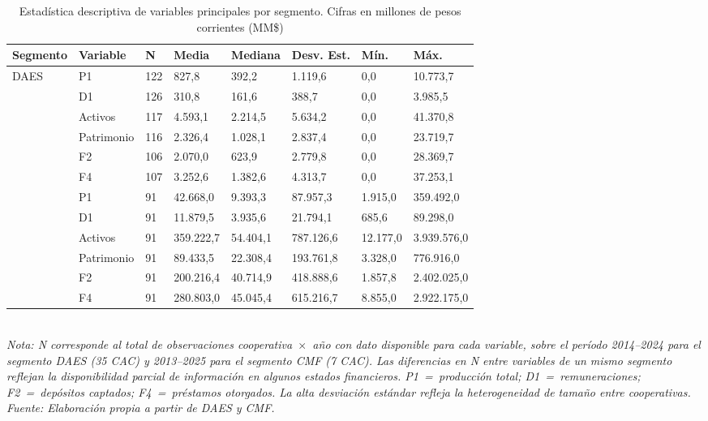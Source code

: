 \begin{table}[H]
\centering
\scriptsize
\setlength{\tabcolsep}{4pt}
\caption{Estadística descriptiva de variables principales por segmento. 
Cifras en millones de pesos corrientes (MM\$)}
\label{tab:estadistica_descriptiva}
\begin{tabular*}{\textwidth}{@{\extracolsep{\fill}}
  p{1.8cm} p{1.8cm} p{1cm} p{1.8cm} p{1.8cm} p{1.8cm} p{1.5cm} p{1.8cm}}
\toprule
\textbf{Segmento} & \textbf{Variable} & \textbf{N} & \textbf{Media} & 
\textbf{Mediana} & \textbf{Desv. Est.} & \textbf{Mín.} & \textbf{Máx.} \\
\midrule
\multirow{6}{*}{DAES} 
  & P1         & 122 & 827,8     & 392,2     & 1.119,6   & 0,0    & 10.773,7  \\
  & D1         & 126 & 310,8     & 161,6     & 388,7     & 0,0    & 3.985,5   \\
  & Activos    & 117 & 4.593,1   & 2.214,5   & 5.634,2   & 0,0    & 41.370,8  \\
  & Patrimonio & 116 & 2.326,4   & 1.028,1   & 2.837,4   & 0,0    & 23.719,7  \\
  & F2         & 106 & 2.070,0   & 623,9     & 2.779,8   & 0,0    & 28.369,7  \\
  & F4         & 107 & 3.252,6   & 1.382,6   & 4.313,7   & 0,0    & 37.253,1  \\
\addlinespace
\multirow{6}{*}{CMF}  
  & P1         & 91  & 42.668,0  & 9.393,3   & 87.957,3  & 1.915,0  & 359.492,0   \\
  & D1         & 91  & 11.879,5  & 3.935,6   & 21.794,1  & 685,6    & 89.298,0    \\
  & Activos    & 91  & 359.222,7 & 54.404,1  & 787.126,6 & 12.177,0 & 3.939.576,0 \\
  & Patrimonio & 91  & 89.433,5  & 22.308,4  & 193.761,8 & 3.328,0  & 776.916,0   \\
  & F2         & 91  & 200.216,4 & 40.714,9  & 418.888,6 & 1.857,8  & 2.402.025,0 \\
  & F4         & 91  & 280.803,0 & 45.045,4  & 615.216,7 & 8.855,0  & 2.922.175,0 \\
\bottomrule
\end{tabular*}
\\[0.8em]
{\footnotesize \textit{Nota: N corresponde al total de observaciones cooperativa~$\times$~año 
con dato disponible para cada variable, sobre el período 2014--2024 para el segmento 
DAES (35 CAC) y 2013--2025 para el segmento CMF (7 CAC). Las diferencias en N entre 
variables de un mismo segmento reflejan la disponibilidad parcial de información en 
algunos estados financieros. P1~=~producción total; D1~=~remuneraciones; 
F2~=~depósitos captados; F4~=~préstamos otorgados. La alta desviación estándar 
refleja la heterogeneidad de tamaño entre cooperativas.}}
\\[0.4em]
{\footnotesize \textit{Fuente: Elaboración propia a partir de DAES y CMF.}}
\end{table}


